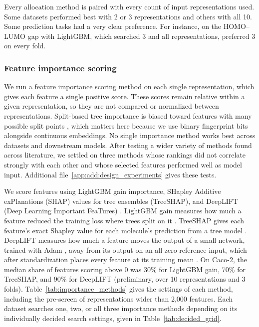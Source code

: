 Every allocation method is paired with every count of input representations used. Some datasets performed best with 2 or 3 representations and others with all 10. Some prediction tasks had a very clear preference. For instance, on the HOMO--LUMO gap with LightGBM, which searched 3 and all representations, preferred 3 on every fold.

\subsubsection{Feature importance scoring}\label{sec:method:importance}

We run a feature importance scoring method on each single representation, which gives each feature a single positive score. These scores remain relative within a given representation, so they are not compared or normalized between representations. Split-based tree importance is biased toward features with many possible split points \citep{Strobl2007}, which matters here because we use binary fingerprint bits alongside continuous embeddings. No single importance method works best across datasets and downstream models. After testing a wider variety of methods found across literature, we settled on three methods whose rankings did not correlate strongly with each other and whose selected features performed well as model input. Additional file~\ref{app:add:design_experiments} gives these tests.

We score features using LightGBM gain importance, SHapley Additive exPlanations (SHAP) values for tree ensembles (TreeSHAP), and DeepLIFT (Deep Learning Important FeaTures) \citep{Shrikumar2017}. LightGBM gain measures how much a feature reduced the training loss where trees split on it \citep{ke2017lightgbm}. TreeSHAP gives each feature's exact Shapley value for each molecule's prediction from a tree model \citep{Lundberg2020}. DeepLIFT measures how much a feature moves the output of a small network, trained with Adam \citep{Kingma2015}, away from its output on an all-zero reference input, which after standardization places every feature at its training mean \citep{Shrikumar2017, Kokhlikyan2020, Ancona2018}. On Caco-2, the median share of features scoring above 0 was 30\% for LightGBM gain, 70\% for TreeSHAP, and 90\% for DeepLIFT (preliminary, over 10 representations and 3 folds). Table~\ref{tab:importance_methods} gives the settings of each method, including the pre-screen of representations wider than 2,000 features. Each dataset searches one, two, or all three importance methods depending on its individually decided search settings, given in Table~\ref{tab:decided_grid}.

